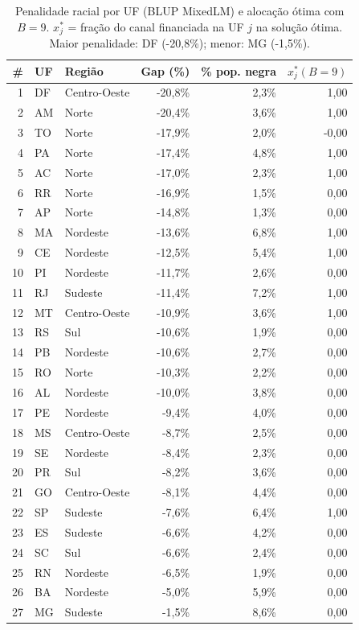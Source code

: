 \begin{table}[H]
  \centering
  \caption{Penalidade racial por UF (BLUP MixedLM) e alocação ótima com $B=9$.
           $x_j^*$ = fração do canal financiada na UF $j$ na solução ótima.
           Maior penalidade: DF (-20,8\%);
           menor: MG (-1,5\%).}
  \label{tab:po_regional_uf}
  \scriptsize
  \begin{tabular}{rllrrr}
    \toprule
    \# & \textbf{UF} & \textbf{Região} & \textbf{Gap (\%)} & \textbf{\% pop. negra} & $x_j^*(B{=}9)$ \\
    \midrule
  1 & DF & Centro-Oeste & -20,8\% & 2,3\% & 1,00 \\
  2 & AM & Norte & -20,4\% & 3,6\% & 1,00 \\
  3 & TO & Norte & -17,9\% & 2,0\% & -0,00 \\
  4 & PA & Norte & -17,4\% & 4,8\% & 1,00 \\
  5 & AC & Norte & -17,0\% & 2,3\% & 1,00 \\
  6 & RR & Norte & -16,9\% & 1,5\% & 0,00 \\
  7 & AP & Norte & -14,8\% & 1,3\% & 0,00 \\
  8 & MA & Nordeste & -13,6\% & 6,8\% & 1,00 \\
  9 & CE & Nordeste & -12,5\% & 5,4\% & 1,00 \\
  10 & PI & Nordeste & -11,7\% & 2,6\% & 0,00 \\
  11 & RJ & Sudeste & -11,4\% & 7,2\% & 1,00 \\
  12 & MT & Centro-Oeste & -10,9\% & 3,6\% & 1,00 \\
  13 & RS & Sul & -10,6\% & 1,9\% & 0,00 \\
  14 & PB & Nordeste & -10,6\% & 2,7\% & 0,00 \\
  15 & RO & Norte & -10,3\% & 2,2\% & 0,00 \\
  16 & AL & Nordeste & -10,0\% & 3,8\% & 0,00 \\
  17 & PE & Nordeste & -9,4\% & 4,0\% & 0,00 \\
  18 & MS & Centro-Oeste & -8,7\% & 2,5\% & 0,00 \\
  19 & SE & Nordeste & -8,4\% & 2,3\% & 0,00 \\
  20 & PR & Sul & -8,2\% & 3,6\% & 0,00 \\
  21 & GO & Centro-Oeste & -8,1\% & 4,4\% & 0,00 \\
  22 & SP & Sudeste & -7,6\% & 6,4\% & 1,00 \\
  23 & ES & Sudeste & -6,6\% & 4,2\% & 0,00 \\
  24 & SC & Sul & -6,6\% & 2,4\% & 0,00 \\
  25 & RN & Nordeste & -6,5\% & 1,9\% & 0,00 \\
  26 & BA & Nordeste & -5,0\% & 5,9\% & 0,00 \\
  27 & MG & Sudeste & -1,5\% & 8,6\% & 0,00 \\
    \bottomrule
  \end{tabular}
\end{table}
